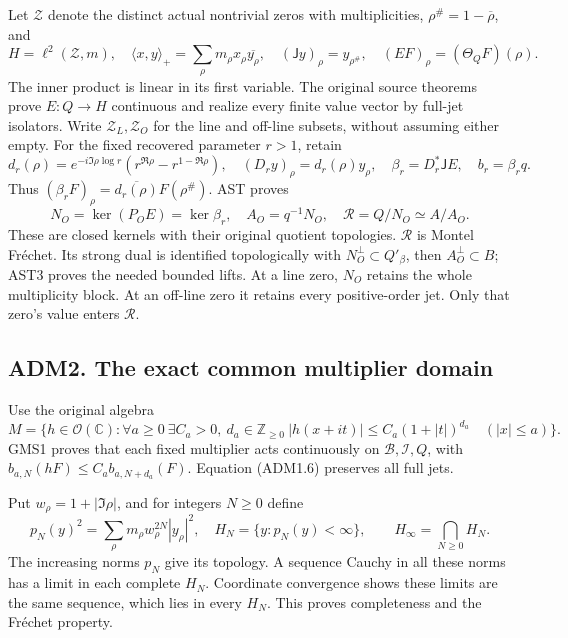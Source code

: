 Let \(\mathscr Z\) denote the distinct actual nontrivial zeros with
multiplicities, \(\rho^\#=1-\overline\rho\), and \[
H=\ell^2(\mathscr Z,m),\quad
\langle x,y\rangle_+=\sum_\rho m_\rho x_\rho\overline{y_\rho},
\quad(\mathsf Jy)_\rho=y_{\rho^\#},\quad
(EF)_\rho=(\Theta_QF)(\rho).
\tag{ADM1.8}
\] The inner product is linear in its first variable. The original
source theorems prove \(E:Q\to H\) continuous and realize every finite
value vector by full-jet isolators. Write \(\mathscr Z_L,\mathscr Z_O\)
for the line and off-line subsets, without assuming either empty. For
the fixed recovered parameter \(r>1\), retain \[
d_r(\rho)=e^{-i\Im\rho\log r}
(r^{\Re\rho}-r^{1-\Re\rho}),\quad
(D_ry)_\rho=d_r(\rho)y_\rho,\quad
\beta_r=D_r^*\mathsf JE,\quad b_r=\beta_rq.
\tag{ADM1.9}
\] Thus \((\beta_rF)_\rho=\overline{d_r(\rho)}F(\rho^\#)\). AST proves
\[
N_O=\ker(P_OE)=\ker\beta_r,\quad A_O=q^{-1}N_O,\quad
\mathcal R=Q/N_O\simeq A/A_O.
\tag{ADM1.10}
\] These are closed kernels with their original quotient topologies.
\(\mathcal R\) is Montel Fréchet. Its strong dual is identified
topologically with \(N_O^\perp\subset Q'_\beta\), then
\(A_O^\perp\subset B\); AST3 proves the needed bounded lifts. At a line
zero, \(N_O\) retains the whole multiplicity block. At an off-line zero
it retains every positive-order jet. Only that zero's value enters
\(\mathcal R\).

\subsection{ADM2. The exact common multiplier
domain}\label{adm2.-the-exact-common-multiplier-domain}

Use the original algebra \[
M=\{h\in\mathcal O(\mathbb C):
\forall a\ge0\ \exists C_a>0,\ d_a\in\mathbb Z_{\ge0}\
|h(x+it)|\le C_a(1+|t|)^{d_a}\quad(|x|\le a)\}.
\tag{ADM2.1}
\] GMS1 proves that each fixed multiplier acts continuously on
\(\mathcal B,\mathcal I,Q\), with \(b_{a,N}(hF)\le C_a b_{a,N+d_a}(F)\).
Equation (ADM1.6) preserves all full jets.

Put \(w_\rho=1+|\Im\rho|\), and for integers \(N\ge0\) define \[
p_N(y)^2=\sum_\rho m_\rho w_\rho^{2N}|y_\rho|^2,\quad
H_N=\{y:p_N(y)<\infty\},\qquad H_\infty=\bigcap_{N\ge0}H_N.
\tag{ADM2.2}
\] The increasing norms \(p_N\) give its topology. A sequence Cauchy in
all these norms has a limit in each complete \(H_N\). Coordinate
convergence shows these limits are the same sequence, which lies in
every \(H_N\). This proves completeness and the Fréchet property.

